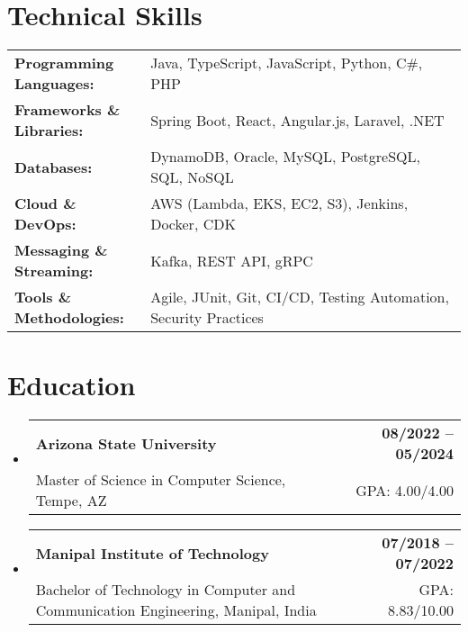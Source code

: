 \documentclass[letterpaper,11pt]{article}
\makeatletter
\newcommand{\educationSubheading}[4]{
  \vspace{-2pt}\item
    \begin{tabular*}{1.0\textwidth}[t]{l@{\extracolsep{\fill}}r}
      \textbf{\small #1} & \textbf{\small #2} \\
      {\small#3} & {\small #4} \\
    \end{tabular*}\vspace{-7pt}
}
\newcommand{\resumeSubHeadingListStart}{\begin{itemize}[leftmargin=0pt, label={}]}
\newcommand{\resumeSubHeadingListEnd}{\end{itemize}}
\makeatother
\begin{document}
\section{Technical Skills}
        \vspace{-14pt}
        \begin{table}[h]
            \footnotesize
            \begin{tabular}{p{0.3\linewidth} p{0.7\linewidth}}
                \textbf{Programming Languages:} & Java, TypeScript, JavaScript, Python, C\#, PHP \\
                \textbf{Frameworks \& Libraries:} & Spring Boot, React, Angular.js, Laravel, .NET \\
                \textbf{Databases:} & DynamoDB, Oracle, MySQL, PostgreSQL, SQL, NoSQL \\
                \textbf{Cloud \& DevOps:} & AWS (Lambda, EKS, EC2, S3), Jenkins, Docker, CDK \\
                \textbf{Messaging \& Streaming:} & Kafka, REST API, gRPC \\
                \textbf{Tools \& Methodologies:} & Agile, JUnit, Git, CI/CD, Testing Automation, Security Practices \\
            \end{tabular}
        \end{table}

 \vspace{-15pt}

\section{Education}
  \resumeSubHeadingListStart
    \educationSubheading
      {Arizona State University}{08/2022 -- 05/2024}
      {Master of Science in Computer Science, Tempe, AZ}{GPA: 4.00/4.00}

    \educationSubheading
      {Manipal Institute of Technology}{07/2018 -- 07/2022}
      {Bachelor of Technology in Computer and Communication Engineering, Manipal, India}{GPA: 8.83/10.00}
  \resumeSubHeadingListEnd
\end{document}
